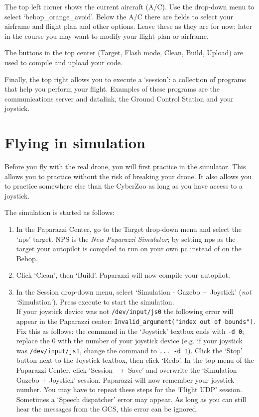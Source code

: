 \documentclass{article}
\begin{document}
The top left corner shows the current aircraft (A/C). Use the drop-down menu to select `bebop\_orange\_avoid'.
Below the A/C there are fields to select your airframe and flight plan and other options. Leave these as they are for now; later in the course you may want to modify your flight plan or airframe.

The buttons in the top center (Target, Flash mode, Clean, Build, Upload) are used to compile and upload your code.

Finally, the top right allows you to execute a `session': a collection of programs that help you perform your flight. Examples of these programs are the communications server and datalink, the Ground Control Station and your joystick.



\section{Flying in simulation}
Before you fly with the real drone, you will first practice in the simulator.
This allows you to practice without the risk of breaking your drone. It also allows you to practice somewhere else than the CyberZoo as long as you have access to a joystick.

\medskip
The simulation is started as follows:
\begin{enumerate}
\item In the Paparazzi Center, go to the Target drop-down menu and select the `nps' target. NPS is the \emph{New Paparazzi Simulator}; by setting nps as the target your autopilot is compiled to run on your own pc instead of on the Bebop.
\item Click `Clean', then `Build'. Paparazzi will now compile your autopilot.
\item In the Session drop-down menu, select `Simulation - Gazebo + Joystick' (\emph{not} `Simulation'). Press execute to start the simulation.\smallskip\\
If your joystick device was not \verb"/dev/input/js0" the following error will appear in the Paparazzi center: \verb|Invalid_argument("index out of bounds")|. Fix this as follows: the command in the `Joystick' textbox ends with \verb"-d 0"; replace the 0 with the number of your joystick device (e.g. if your joystick was \verb"/dev/input/js1", change the command to \verb"... -d 1"). Click the `Stop' button next to the Joystick textbox, then click `Redo'. In the top menu of the Paparazzi Center, click `Session $\rightarrow$ Save' and overwrite the `Simulation - Gazebo + Joystick' session. Paparazzi will now remember your joystick number. You may have to repeat these steps for the `Flight UDP' session.\smallskip\\
Sometimes a `Speech dispatcher' error may appear. As long as you can still hear the messages from the GCS, this error can be ignored.
\end{enumerate}
\end{document}
